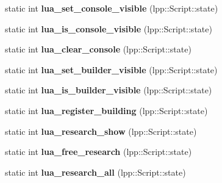 \begin{DoxyCompactItemize}
\item 
static int {\bfseries lua\+\_\+set\+\_\+console\+\_\+visible} (lpp\+::\+Script\+::state)\hypertarget{class_lua_interface_a59221dc3ac32a19810a35660ca129e0d}{}\label{class_lua_interface_a59221dc3ac32a19810a35660ca129e0d}

\item 
static int {\bfseries lua\+\_\+is\+\_\+console\+\_\+visible} (lpp\+::\+Script\+::state)\hypertarget{class_lua_interface_ad71fc0cba99e5c08a775fde2436d1b56}{}\label{class_lua_interface_ad71fc0cba99e5c08a775fde2436d1b56}

\item 
static int {\bfseries lua\+\_\+clear\+\_\+console} (lpp\+::\+Script\+::state)\hypertarget{class_lua_interface_a716e417710b0ce21b9920fdd4fc82d68}{}\label{class_lua_interface_a716e417710b0ce21b9920fdd4fc82d68}

\item 
static int {\bfseries lua\+\_\+set\+\_\+builder\+\_\+visible} (lpp\+::\+Script\+::state)\hypertarget{class_lua_interface_ac33827c5459952fe83fdc7c8ac9b019d}{}\label{class_lua_interface_ac33827c5459952fe83fdc7c8ac9b019d}

\item 
static int {\bfseries lua\+\_\+is\+\_\+builder\+\_\+visible} (lpp\+::\+Script\+::state)\hypertarget{class_lua_interface_ac25f5d29393cbf400ce2292af2578b80}{}\label{class_lua_interface_ac25f5d29393cbf400ce2292af2578b80}

\item 
static int {\bfseries lua\+\_\+register\+\_\+building} (lpp\+::\+Script\+::state)\hypertarget{class_lua_interface_a3ab5ddbefc72049ad4e8081f98510e7f}{}\label{class_lua_interface_a3ab5ddbefc72049ad4e8081f98510e7f}

\item 
static int {\bfseries lua\+\_\+research\+\_\+show} (lpp\+::\+Script\+::state)\hypertarget{class_lua_interface_a5f4f5f57a0153fdcf869e0162fa68661}{}\label{class_lua_interface_a5f4f5f57a0153fdcf869e0162fa68661}

\item 
static int {\bfseries lua\+\_\+free\+\_\+research} (lpp\+::\+Script\+::state)\hypertarget{class_lua_interface_a39de4d8133e003f78e248c1c1b067fa7}{}\label{class_lua_interface_a39de4d8133e003f78e248c1c1b067fa7}

\item 
static int {\bfseries lua\+\_\+research\+\_\+all} (lpp\+::\+Script\+::state)\hypertarget{class_lua_interface_ae1e9901ce83d05d895e15ebd9f870f59}{}\label{class_lua_interface_ae1e9901ce83d05d895e15ebd9f870f59}


\end{DoxyCompactItemize}
